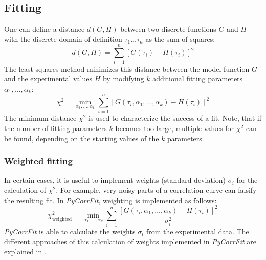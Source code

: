 \subsection{Fitting}
\label{sec:theor.nonle}
One can define a distance $d(G,H)$ between two discrete functions $G$ and $H$ with the discrete domain of definition $\tau_1 \dots \tau_n$ as the sum of squares:
\begin{equation}
d(G,H) = \sum_{i=1}^n \left[ G(\tau_i) - H(\tau_i) \right]^2
\end{equation}
The least-squares method minimizes this distance between the model function $G$ and the experimental values $H$ by modifying $k$ additional fitting parameters $\alpha_1, \dots, \alpha_k$:
\begin{equation}
\chi^2 = \min_{\alpha_1, \dots, \alpha_k} \sum_{i=1}^n \left[ G(\tau_i,\alpha_1, \dots, \alpha_k) - H(\tau_i) \right]^2
\end{equation}
The minimum distance $\chi^2$ is used to characterize the success of a fit. Note, that if the number of fitting parameters $k$ becomes too large, multiple values for $\chi^2$ can be found, depending on the starting values of the $k$ parameters.


\subsubsection{Weighted fitting}
\label{sec:theor.weigh}
In certain cases, it is useful to implement weights (standard deviation) $\sigma_i$ for the calculation of $\chi^2$. For example, very noisy parts of a correlation curve can falsify the resulting fit. In \textit{PyCorrFit}, weighting is implemented as follows:
\begin{equation}
\chi^2_\mathrm{weighted} = \min_{\alpha_1, \dots, \alpha_k} \sum_{i=1}^n  \frac{\left[ G(\tau_i,\alpha_1, \dots, \alpha_k) - H(\tau_i) \right]^2}{\sigma_i^2}
\end{equation}
\textit{PyCorrFit} is able to calculate the weights $\sigma_i$ from the experimental data. The different approaches of this calculation of weights implemented in \textit{PyCorrFit} are explained in .


